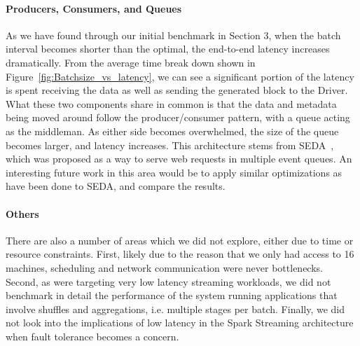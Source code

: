 \paragraph{Producers, Consumers, and Queues}
As we have found through our initial benchmark in Section 3, when the batch interval becomes shorter than the optimal, the end-to-end latency increases dramatically. From the average time break down shown in Figure~\ref{fig:Batchsize_vs_latency}, we can see a significant portion of the latency is spent receiving the data as well as sending the generated block to the Driver. What these two components share in common is that the data and metadata being moved around follow the producer/consumer pattern, with a queue acting as the middleman. As either side becomes overwhelmed, the size of the queue becomes larger, and latency increases. This architecture stems from SEDA~\cite{SEDA}, which was proposed as a way to serve web requests in multiple event queues. An interesting future work in this area would be to apply similar optimizations as have been done to SEDA, and compare the results.

\paragraph{Others} There are also a number of areas which we did not explore, either due to time or resource constraints. First, likely due to the reason that we only had access to 16 machines, scheduling and network communication were never bottlenecks. Second, as were targeting very low latency streaming workloads, we did not benchmark in detail the performance of the system running applications that involve shuffles and aggregations, i.e. multiple stages per batch. Finally, we did not look into the implications of low latency in the Spark Streaming architecture when fault tolerance becomes a concern.
